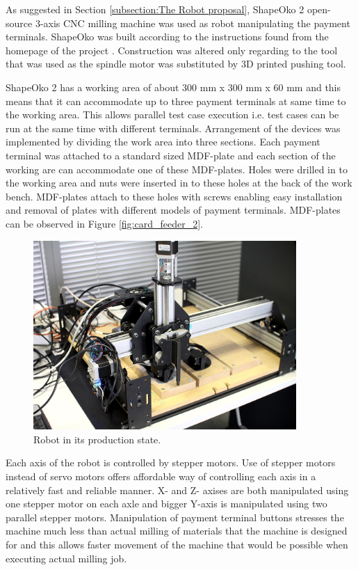 As suggested in Section \ref{subsection:The Robot proposal}, ShapeOko 2 open-source 3-axis CNC milling machine was used as robot manipulating the payment terminals. ShapeOko was built according to the instructions found from the homepage of the project \emph{\citep{shapeoko}}. Construction was altered only regarding to the tool that was used as the spindle motor was substituted by 3D printed pushing tool.

ShapeOko 2 has a working area of about 300 mm x 300 mm x 60 mm and this means that it can accommodate up to three payment terminals at same time to the working area. This allows parallel test case execution i.e. test cases can be run at the same time with different terminals. Arrangement of the devices was implemented by dividing the work area into three sections. Each payment terminal was attached to a standard sized MDF-plate and each section of the working are can accommodate one of these MDF-plates. Holes were drilled in to the working area and nuts were inserted in to these holes at the back of the work bench. MDF-plates attach to these holes with screws enabling easy installation and removal of plates with different models of payment terminals. MDF-plates can be observed in Figure \ref{fig:card_feeder_2}.

\begin{figure}[ht]
  \begin{center}
    \includegraphics[width=10cm]{images/robot.jpg}
    \caption{Robot in its production state.}
    \label{fig:robot_final}
  \end{center}
\end{figure}
\FloatBarrier

Each axis of the robot is controlled by stepper motors. Use of stepper motors instead of servo motors offers affordable way of controlling each axis in a relatively fast and reliable manner. X- and Z- axises are both manipulated using one stepper motor on each axle and bigger Y-axis is manipulated using two parallel stepper motors. Manipulation of payment terminal buttons stresses the machine much less than actual milling of materials that the machine is designed for and this allows faster movement of the machine that would be possible when executing actual milling job.

